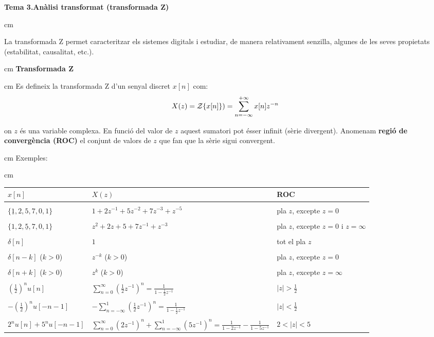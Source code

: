 \documentclass{article}
\begin{document}
\textbf{\Large Tema 3.An\`alisi transformat (transformada Z)}

 cm

La transformada Z permet caracteritzar els sistemes digitals i estudiar, 
de manera relativament senzilla, algunes de les seves propietats (estabilitat, causalitat, etc.).

 cm
\noindent
\textbf{Transformada Z}

 cm
\noindent
Es defineix la transformada Z d'un senyal discret $x[n]$ com:
\[
X(z)={\cal Z} \{x[n]\})=\sum_{n=-\infty}^{+\infty} x[n] z^{-n}
\]

\noindent
on $z$ \'es una variable complexa. En funci\'o del valor de $z$ aquest sumatori pot 
\'esser infinit (s\`erie divergent). Anomenam \textbf{regi\'o de converg\`encia (ROC)}
el conjunt de valors de $z$ que fan que la s\`erie sigui convergent.

 cm
\noindent
Exemples:

 cm
\begin{tabular}{l|l|l}
$x[n]$ & $X(z)$ & ROC \\ \hline  & & \\
$\{\underline{1}, 2, 5, 7, 0, 1 \}$ & $1+2z^{-1}+5z^{-2}+7z^{-3}+z^{-5}$ &
pla $z$, excepte $z=0$ \\ \hline  & & \\
$\{1, 2, \underline{5}, 7, 0, 1 \}$ & $z^2+2z+5+7z^{-1}+z^{-3}$ &
pla $z$, excepte $z=0$ i $z=\infty$ \\ \hline  & & \\
$\delta[n]$ & $1$ & tot el pla $z$ \\ \hline  & & \\
$\delta[n-k]$ ($k > 0$) & $z^{-k}$ ($k > 0$) & pla $z$, excepte $z=0$ \\ \hline  & & \\
$\delta[n+k]$ ($k > 0$) & $z^{k}$ ($k > 0$) & pla $z$, excepte $z=\infty$ \\ \hline  & & \\
$(\frac{1}{2})^n u[n]$ & $\sum_{n=0}^{\infty} \left(\frac{1}{2} z^{-1} \right)^n=\displaystyle \frac{1}{1-\frac{1}{2}z^{-1}}$ &
$|z| > \frac{1}{2}$ \\ \hline  & & \\
$-(\frac{1}{2})^n u[-n-1]$ & $-\sum_{n=-\infty}^{1} \left( \frac{1}{2} z^{-1} \right)^n=\displaystyle \frac{1}{1-\frac{1}{2} z^{-1}}$ &
$|z| < \frac{1}{2}$ \\ \hline  & & \\
$2^n u[n] + 5^n u[-n-1]$ & 
$\sum_{n=0}^{\infty} \left(2 z^{-1} \right)^n + \sum_{n=-\infty}^{1} \left( 5 z^{-1} \right)^n=\frac{1}{1-2 z^{-1}} - \frac{1}{1-5 z^{-1}}$ &
$2 < |z| < 5$ \\ \hline 
\end{tabular}
\end{document}
